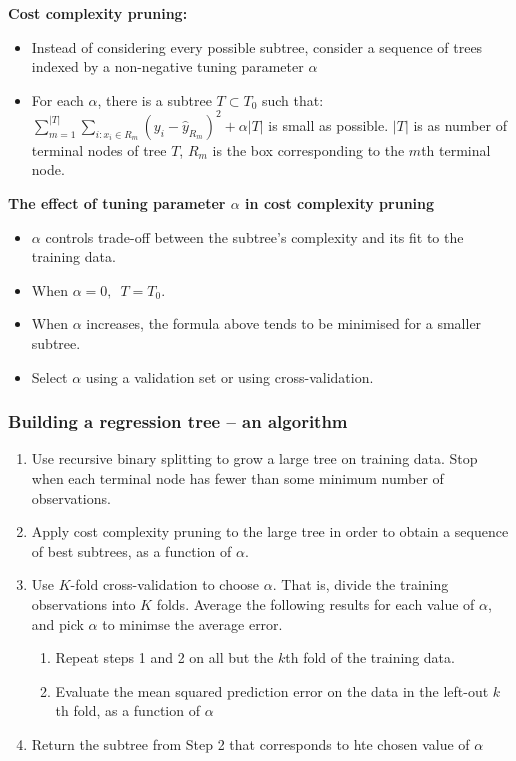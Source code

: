 \documentclass[11pt]{article}
\begin{document}
\noindent \textbf{Cost complexity pruning:}
\begin{itemize}
    \item Instead of considering every possible subtree, consider a sequence of trees indexed by a non-negative tuning parameter $\alpha$
    \item For each $\alpha$, there is a subtree $T \subset T_0$ such that: $\sum_{m=1}^{|T|}\sum_{i: x_i \in R_m}{(y_i - \hat{y}_{R_m})^2} + \alpha|T|$ is small as possible. $|T|$ is as number of terminal nodes of tree $T$, $R_m$ is the box corresponding to the $m$th terminal node.
\end{itemize} \phantom{i}

\noindent \textbf{The effect of tuning parameter $\alpha$ in cost complexity pruning}
\begin{itemize}
    \item $\alpha$ controls trade-off between the subtree's complexity and its fit to the training data.
    \item When $\alpha = 0, \: \; T = T_0$.
    \item When $\alpha$ increases, the formula above tends to be minimised for a smaller subtree.
    \item Select $\alpha$ using a validation set or using cross-validation.
\end{itemize}

\subsubsection{Building a regression tree -- an algorithm}
\begin{enumerate}
    \item Use recursive binary splitting to grow a large tree on training data. Stop when each terminal node has fewer than some minimum number of observations.
    \item Apply cost complexity pruning to the large tree in order to obtain a sequence of best subtrees, as a function of $\alpha$.
    \item Use $K$-fold cross-validation to choose $\alpha$. That is, divide the training observations into $K$ folds.  Average the following results for each value of $\alpha$, and pick $\alpha$ to minimse the average error.
        \begin{enumerate}
            \item Repeat steps 1 and 2 on all but the $k$th fold of the training data.
            \item Evaluate the mean squared prediction error on the data in the left-out $k$th fold, as a function of $\alpha$
        \end{enumerate}
    \item Return the subtree from Step 2 that corresponds to hte chosen value of $\alpha$
\end{enumerate}
\end{document}
